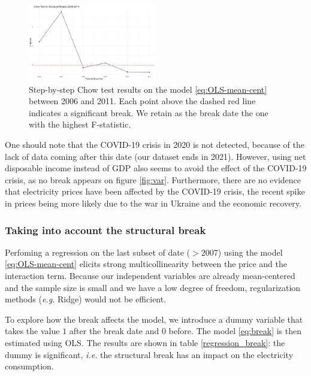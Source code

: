 \begin{figure}[h]
    \centering
      \includegraphics[width=0.5\textwidth]{Images/chow_test_results.jpeg}
      \caption{Step-by-step Chow test results on the model \ref{eq:OLS-mean-cent} between 2006 and 2011. Each point above the dashed red line indicates a significant break. We retain as the break date the one with the highest F-statistic.}
    \label{fig:chow-break}
\end{figure}

One should note that the COVID-19 crisis in 2020 is not detected, because of the lack of data coming after this date (our dataset ends in 2021). However, using net disposable income instead of GDP also seems to avoid the effect of the COVID-19 crisis, as no break appears on figure \ref{fig:var}. Furthermore, there are no evidence that electricity prices have been affected by the COVID-19 crisis, the recent spike in prices being more likely due to the war in Ukraine and the economic recovery.

\subsubsection{Taking into account the structural break}
Perfoming a regression on the last subset of date ($> 2007$) using the model \eqref{eq:OLS-mean-cent} elicits strong multicollinearity between the price and the interaction term. Because our independent variables are already mean-centered and the sample size is small and we have a low degree of freedom, regularization methods (\textit{e.g.} Ridge) would not be efficient. 

To explore how the break affects the model, we introduce a dummy variable that takes the value $1$ after the break date and $0$ before. The model \eqref{eq:break} is then estimated using OLS. The results are shown in table \ref{regression_break}: the dummy is significant, \textit{i.e.} the structural break has an impact on the electricity consumption. 

